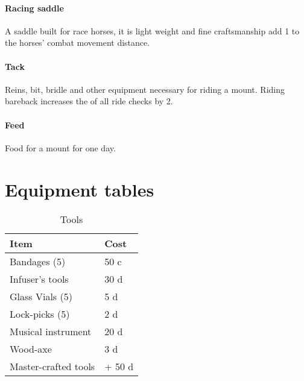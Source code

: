 \documentclass[a4paper,11pt,oneside]{book}
\newcommand{\textlf}[1]{\textbf{\titlecap{#1}}}
\begin{document}
\subsubsection*{Racing saddle}
A saddle built for race horses, it is light weight and fine craftsmanship add 1 to the horses' combat movement distance.

\subsubsection*{Tack}
Reins, bit, bridle and other equipment necessary for riding a mount. Riding bareback increases the \textlf{difficulty} of all ride checks by 2.

\subsubsection*{Feed}
Food for a mount for one day.

\chapter{Equipment tables}
\begin{table}[ht]
	\centering
	\caption{Tools}
	\begin{tabular}{|l|l|}
		\hline
		Item & Cost\\ [0.5ex]
		\hline
		Bandages (5)& 50 c\\
		Infuser's tools & 30 d\\
		Glass Vials (5)& 5 d\\
		Lock-picks (5) & 2 d\\
		Musical instrument & 20 d\\
		Wood-axe & 3 d\\		
		\hline
		Master-crafted tools & + 50 d\\
		\hline
	\end{tabular}
\end{table}
\end{document}

